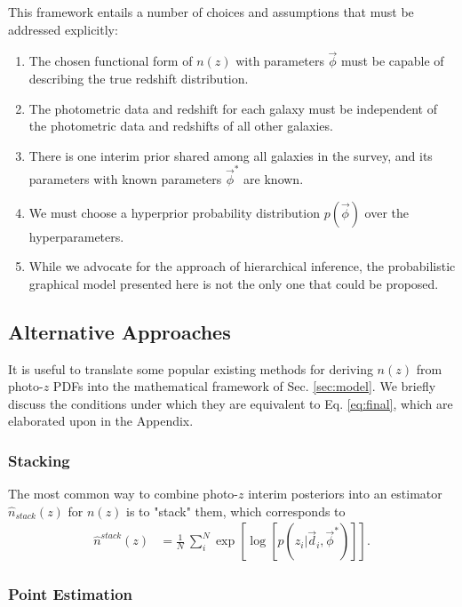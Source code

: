 \documentclass[iop]{emulateapj}
\begin{document}
This framework entails a number of choices and assumptions that must be addressed explicitly:
\begin{enumerate}
	\item The chosen functional form of $n(z)$ with parameters $\vec{\phi}$ must be capable of describing the true redshift distribution.
	\item The photometric data and redshift for each galaxy must be independent of the photometric data and redshifts of all other galaxies.
	\item There is one interim prior shared among all galaxies in the survey, and its parameters with known parameters $\vec{\phi}^{*}$ are known.
	\item We must choose a hyperprior probability distribution $p(\vec{\phi})$ over the hyperparameters.
	\item While we advocate for the approach of hierarchical inference, the probabilistic graphical model presented here is not the only one that could be proposed.
\end{enumerate}

\subsection{Alternative Approaches}
\label{sec:others}

It is useful to translate some popular existing methods for deriving $n(z)$ from photo-$z$ PDFs into the mathematical framework of Sec. \ref{sec:model}.  We briefly discuss the conditions under which they are equivalent to Eq. \ref{eq:final}, which are elaborated upon in the Appendix.

\subsubsection{Stacking}
\label{sec:stacking}

The most common way to combine photo-$z$ interim posteriors into an estimator $\hat{n}_{stack}(z)$ for $n(z)$ is to "stack" them, which corresponds to
\begin{align}
\label{eq:stack}
\hat{n}^{stack}(z) &= \frac{1}{N}\ \sum_{i}^{N} \exp\left[\log[p(z_{i} | \vec{d}_{i}, \vec{\phi}^{*})]\right].
\end{align}

\subsubsection{Point Estimation}
\label{sec:point_estimation}
\end{document}
